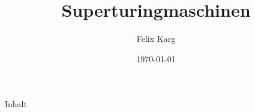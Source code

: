 \documentclass[12pt,compress,ngerman,utf8,t]{beamer}
\date{\today}
\institute{University of Freiburg}
\title{Superturingmaschinen}
\author{Felix Karg}
\begin{document}
\maketitle



\begin{frame}{Inhalt}
    \large
    \begin{multicols}{2}
        \tableofcontents[hidesubsections]
    \end{multicols}
    \clearpage
\end{frame}







% 





\end{document}
